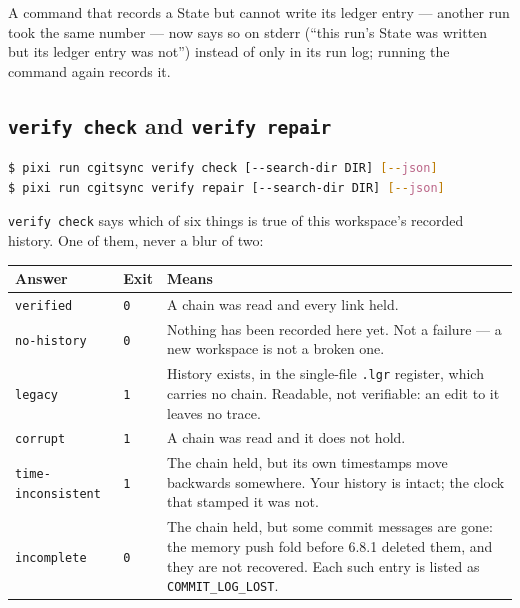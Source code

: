A command that records a State but cannot write its ledger entry --- another
run took the same number --- now says so on stderr (``this run's State was
written but its ledger entry was not'') instead of only in its run log;
running the command again records it.

\subsection{\texttt{verify check} and \texttt{verify repair}}

\begin{lstlisting}[language=bash]
$ pixi run cgitsync verify check [--search-dir DIR] [--json]
$ pixi run cgitsync verify repair [--search-dir DIR] [--json]
\end{lstlisting}

\texttt{verify check} says which of six things is true of this workspace's recorded history.
One of them, never a blur of two:

\begin{center}
\begin{tabular}{llp{7.6cm}}
\textbf{Answer} & \textbf{Exit} & \textbf{Means} \\
\hline
\texttt{verified}   & \texttt{0} & A chain was read and every link held. \\
\texttt{no-history} & \texttt{0} & Nothing has been recorded here yet. Not
                                    a failure --- a new workspace is not a
                                    broken one. \\
\texttt{legacy}     & \texttt{1} & History exists, in the single-file
                                    \texttt{.lgr} register, which carries no
                                    chain. Readable, not verifiable: an edit
                                    to it leaves no trace. \\
\texttt{corrupt}    & \texttt{1} & A chain was read and it does not hold. \\
\texttt{time-inconsistent} & \texttt{1} & The chain held, but its own
                                    timestamps move backwards somewhere.
                                    Your history is intact; the clock that
                                    stamped it was not. \\
\texttt{incomplete} & \texttt{0} & The chain held, but some commit
                                    messages are gone: the memory push fold
                                    before 6.8.1 deleted them, and they are
                                    not recovered. Each such entry is listed
                                    as \texttt{COMMIT\_LOG\_LOST}. \\
\end{tabular}
\end{center}

